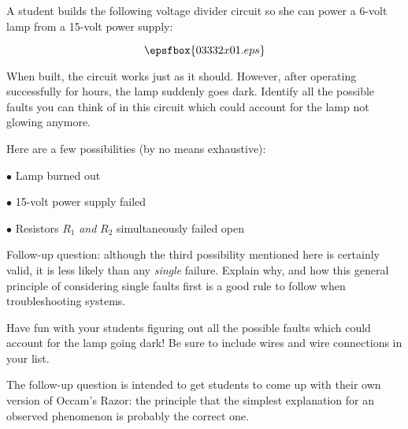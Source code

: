 

A student builds the following voltage divider circuit so she can power a 6-volt lamp from a 15-volt power supply:

$$\epsfbox{03332x01.eps}$$

When built, the circuit works just as it should.  However, after operating successfully for hours, the lamp suddenly goes dark.  Identify all the possible faults you can think of in this circuit which could account for the lamp not glowing anymore.







Here are a few possibilities (by no means exhaustive):

\medskip
\item{$\bullet$} Lamp burned out
\item{$\bullet$} 15-volt power supply failed
\item{$\bullet$} Resistors $R_1$ {\it and} $R_2$ simultaneously failed open
\medskip

\vskip 10pt

Follow-up question: although the third possibility mentioned here is certainly valid, it is less likely than any {\it single} failure.  Explain why, and how this general principle of considering single faults first is a good rule to follow when troubleshooting systems.







Have fun with your students figuring out all the possible faults which could account for the lamp going dark!  Be sure to include wires and wire connections in your list.

The follow-up question is intended to get students to come up with their own version of Occam's Razor: the principle that the simplest explanation for an observed phenomenon is probably the correct one.




